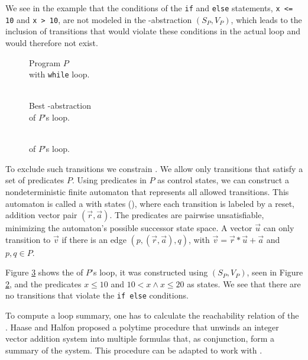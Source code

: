 We see in the example that the conditions of the \texttt{if} and \texttt{else} statements, \texttt{x <= 10} and \texttt{x > 10}, are not modeled in the \qvasr-abstraction $(S_P, V_P)$, which leads to the inclusion of transitions that would violate these conditions in the actual loop and would therefore not exist. \\
\begin{minipage}[t]{0.3\linewidth} \centering
	\begin{figure}[H]
		
		\caption{Program $P$ \\ with \texttt{while} loop.}
		\label{code}
	\end{figure}
\end{minipage}
\begin{minipage}[t]{0.35\linewidth} \centering
	\begin{figure}[H]
			
			\caption{\\ Best \qvasr-abstraction \\ of $P$'s loop.}
			\label{vasr}
	\end{figure}
\end{minipage}
\begin{minipage}[t]{0.3\linewidth} \centering
	\begin{figure}[H]
		
		\caption{\\ \qvasrs of $P$'s loop.}
		\label{vasrs}
	\end{figure}
\end{minipage}
\vspace*{1cm}

To exclude such transitions we constrain \qvasr. We allow only transitions that satisfy a set of predicates $P$. Using predicates in $P$ as control states, we can construct a nondeterministic finite automaton that represents all allowed transitions. This automaton is called a \qvasr with states (\qvasrs), where each transition is labeled by a reset, addition vector pair $(\vec{r}, \vec{a})$. The predicates are pairwise unsatisfiable, minimizing the automaton's possible successor state space. A vector $\vec{u}$ can only transition to $\vec{v}$ if there is an edge $(p, (\vec{r}, \vec{a}), q)$, with $\vec{v} = \vec{r} * \vec{u} + \vec{a}$ and $p, q \in P$. \par
Figure \ref{vasrs} shows the \qvasrs of $P$'s loop, it was constructed using $(S_P, V_P)$, seen in Figure \ref{vasr}, and the predicates $x \leq 10$ and $10 < x \land x \leq 20$ as states. We see that there are no transitions that violate the \texttt{if else} conditions. \par
To compute a loop summary, one has to calculate the reachability relation of the \qvasrs. Haase and Halfon \cite{DBLP:conf/rp/HaaseH14} proposed a polytime procedure that unwinds an integer vector addition system into multiple formulas that, as conjunction, form a summary of the system. This procedure can be adapted to work with \qvasrs. \\ \par

